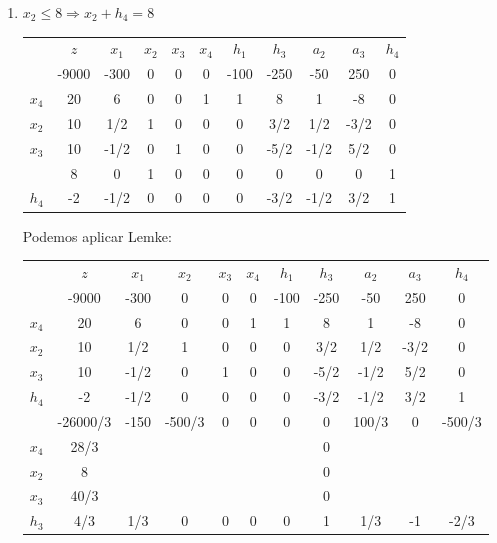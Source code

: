 \begin{enumerate}
\item $x_2 \leq 8 \Rightarrow x_2 + h_4 = 8$

\begin{center}
\begin{tabular}{c|c|ccccccccc|}
      & $z$   & $x_1$   & $x_2$   & $x_3$   & $x_4$ & $h_1$ & $h_3$ & $a_2$ & $a_3$ & $h_4$\\ 
      & -9000 & -300    & 0       & 0       & 0     & -100  & -250  & -50   & 250   & 0\\ 
\hline
$x_4$ & 20    & 6       & 0       & 0       & 1     & 1     & 8     & 1     & -8    & 0\\ 
$x_2$ & 10    & 1/2     & 1       & 0       & 0     & 0     & 3/2   & 1/2   & -3/2  & 0\\ 
$x_3$ & 10    & -1/2    & 0       & 1       & 0     & 0     & -5/2  & -1/2  & 5/2   & 0\\
\hline
      &  8    & 0       & 1       & 0       & 0     & 0     & 0     & 0     & 0     & 1\\
\hline
$h_4$ &  -2   & -1/2    & 0      & 0       & 0     & 0     & -3/2  & -1/2  & 3/2   & 1\\
\hline      
\end{tabular}
\end{center}

Podemos aplicar Lemke:

\begin{center}
\begin{tabular}{c|c|ccccccccc|}
      & $z$   & $x_1$   & $x_2$   & $x_3$   & $x_4$ & $h_1$ & $h_3$ & $a_2$ & $a_3$ & $h_4$\\ 
      & -9000 & -300    & 0       & 0       & 0     & -100  & -250  & -50   & 250   & 0\\ 
\hline
$x_4$ & 20    & 6       & 0       & 0       & 1     & 1     & 8     & 1     & -8    & 0\\ 
$x_2$ & 10    & 1/2     & 1       & 0       & 0     & 0     & 3/2   & 1/2   & -3/2  & 0\\ 
$x_3$ & 10    & -1/2    & 0       & 1       & 0     & 0     & -5/2  & -1/2  & 5/2   & 0\\
$h_4$ &  -2   & -1/2    & 0       & 0       & 0     & 0     & -3/2  & -1/2  & 3/2   & 1\\
\hline      
  &-26000/3   & -150    & -500/3  & 0       & 0     & 0     & 0     & 100/3 & 0     &  -500/3\\ 
\hline
$x_4$ &  28/3 &         &         &         &       &       & 0     &       &       & \\ 
$x_2$ &  8    &         &         &         &       &       & 0     &       &       &  \\ 
$x_3$ & 40/3  &         &         &         &       &       & 0     &       &       &  \\
$h_3$ & 4/3   & 1/3     & 0       & 0       & 0     & 0     & 1     & 1/3   & -1    & -2/3\\
\hline      
\end{tabular}
\end{center}


\end{enumerate}
